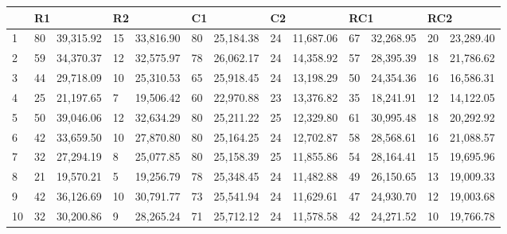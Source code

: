 \begin{table}[caption={Best Results, 800 Locations}, label=tab:2]
    \begin{tabular}{lllllllllllll}
        \toprule
        & \multicolumn{2}{l}{R1} & \multicolumn{2}{l}{R2} & \multicolumn{2}{l}{C1} & \multicolumn{2}{l}{C2} & \multicolumn{2}{l}{RC1} & \multicolumn{2}{l}{RC2} \\
        \midrule
        1  & 80 & 39,315.92 & 15 & 33,816.90 & 80 & 25,184.38 & 24 & 11,687.06 & 67 & 32,268.95 & 20 & 23,289.40 \\
        2  & 59 & 34,370.37 & 12 & 32,575.97 & 78 & 26,062.17 & 24 & 14,358.92 & 57 & 28,395.39 & 18 & 21,786.62 \\
        3  & 44 & 29,718.09 & 10 & 25,310.53 & 65 & 25,918.45 & 24 & 13,198.29 & 50 & 24,354.36 & 16 & 16,586.31 \\
        4  & 25 & 21,197.65 & 7  & 19,506.42 & 60 & 22,970.88 & 23 & 13,376.82 & 35 & 18,241.91 & 12 & 14,122.05 \\
        5  & 50 & 39,046.06 & 12 & 32,634.29 & 80 & 25,211.22 & 25 & 12,329.80 & 61 & 30,995.48 & 18 & 20,292.92 \\
        6  & 42 & 33,659.50 & 10 & 27,870.80 & 80 & 25,164.25 & 24 & 12,702.87 & 58 & 28,568.61 & 16 & 21,088.57 \\
        7  & 32 & 27,294.19 & 8  & 25,077.85 & 80 & 25,158.39 & 25 & 11,855.86 & 54 & 28,164.41 & 15 & 19,695.96 \\
        8  & 21 & 19,570.21 & 5  & 19,256.79 & 78 & 25,348.45 & 24 & 11,482.88 & 49 & 26,150.65 & 13 & 19,009.33 \\
        9  & 42 & 36,126.69 & 10 & 30,791.77 & 73 & 25,541.94 & 24 & 11,629.61 & 47 & 24,930.70 & 12 & 19,003.68 \\
        10 & 32 & 30,200.86 & 9  & 28,265.24 & 71 & 25,712.12 & 24 & 11,578.58 & 42 & 24,271.52 & 10 & 19,766.78  \\
    \end{tabular} \\
\end{table}

